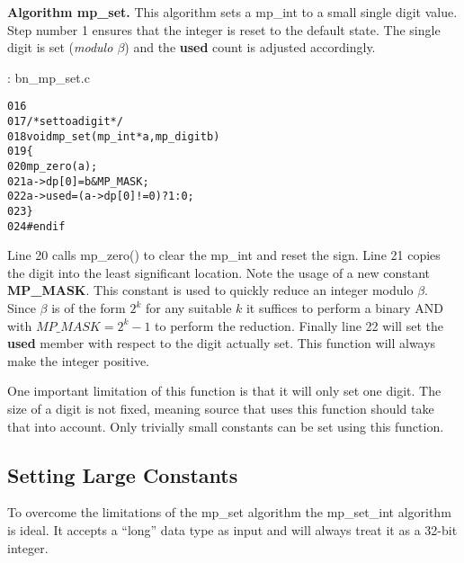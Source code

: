 \documentclass[b5paper]{book}
\begin{document}
\textbf{Algorithm mp\_set.}
This algorithm sets a mp\_int to a small single digit value.  Step number 1 ensures that the integer is reset to the default state.  The
single digit is set (\textit{modulo $\beta$}) and the \textbf{used} count is adjusted accordingly.

\vspace{+3mm}\begin{small}
\hspace{-5.1mm}{\bf File}: bn\_mp\_set.c
\vspace{-3mm}
\begin{alltt}
016   
017   /* set to a digit */
018   void mp_set (mp_int * a, mp_digit b)
019   \{
020     mp_zero (a);
021     a->dp[0] = b & MP_MASK;
022     a->used  = (a->dp[0] != 0) ? 1 : 0;
023   \}
024   #endif
\end{alltt}
\end{small}

Line 20 calls mp\_zero() to clear the mp\_int and reset the sign.  Line 21 copies the digit 
into the least significant location.  Note the usage of a new constant \textbf{MP\_MASK}.  This constant is used to quickly
reduce an integer modulo $\beta$.  Since $\beta$ is of the form $2^k$ for any suitable $k$ it suffices to perform a binary AND with 
$MP\_MASK = 2^k - 1$ to perform the reduction.  Finally line 22 will set the \textbf{used} member with respect to the 
digit actually set. This function will always make the integer positive.

One important limitation of this function is that it will only set one digit.  The size of a digit is not fixed, meaning source that uses 
this function should take that into account.  Only trivially small constants can be set using this function.

\subsection{Setting Large Constants}
To overcome the limitations of the mp\_set algorithm the mp\_set\_int algorithm is ideal.  It accepts a ``long''
data type as input and will always treat it as a 32-bit integer.
\end{document}
